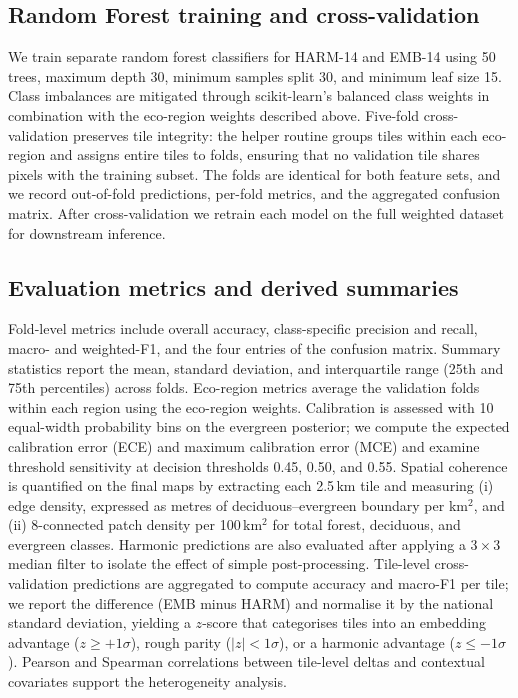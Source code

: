 \documentclass[utf8]{FrontiersinHarvard}
\begin{document}
\subsection{Random Forest training and cross-validation}
We train separate random forest classifiers for HARM-14 and EMB-14 using 50 trees, maximum depth 30, minimum samples split 30, and minimum leaf size 15. Class imbalances are mitigated through scikit-learn’s balanced class weights in combination with the eco-region weights described above. Five-fold cross-validation preserves tile integrity: the helper routine groups tiles within each eco-region and assigns entire tiles to folds, ensuring that no validation tile shares pixels with the training subset. The folds are identical for both feature sets, and we record out-of-fold predictions, per-fold metrics, and the aggregated confusion matrix. After cross-validation we retrain each model on the full weighted dataset for downstream inference.

\subsection{Evaluation metrics and derived summaries}
Fold-level metrics include overall accuracy, class-specific precision and recall, macro- and weighted-F1, and the four entries of the confusion matrix. Summary statistics report the mean, standard deviation, and interquartile range (25th and 75th percentiles) across folds. Eco-region metrics average the validation folds within each region using the eco-region weights. Calibration is assessed with 10 equal-width probability bins on the evergreen posterior; we compute the expected calibration error (ECE) and maximum calibration error (MCE) and examine threshold sensitivity at decision thresholds 0.45, 0.50, and 0.55. Spatial coherence is quantified on the final maps by extracting each 2.5\,km tile and measuring (i) edge density, expressed as metres of deciduous–evergreen boundary per km$^2$, and (ii) 8-connected patch density per 100\,km$^2$ for total forest, deciduous, and evergreen classes. Harmonic predictions are also evaluated after applying a $3 \times 3$ median filter to isolate the effect of simple post-processing. Tile-level cross-validation predictions are aggregated to compute accuracy and macro-F1 per tile; we report the difference (EMB minus HARM) and normalise it by the national standard deviation, yielding a $z$-score that categorises tiles into an embedding advantage (\(z \ge +1\sigma\)), rough parity (\(|z| < 1\sigma\)), or a harmonic advantage (\(z \le -1\sigma\)). Pearson and Spearman correlations between tile-level deltas and contextual covariates support the heterogeneity analysis.
\end{document}
